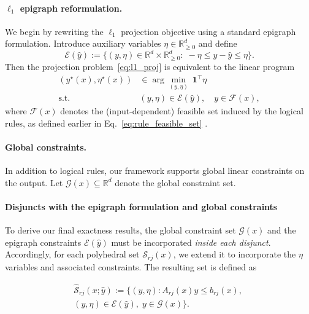 \documentclass{article}
\theoremstyle{plain}
\theoremstyle{definition}
\theoremstyle{remark}
\begin{document}
\paragraph{$\ell_1$ epigraph reformulation.}
We begin by rewriting the $\ell_1$ projection objective using a standard epigraph formulation.
Introduce auxiliary variables $\eta \in \mathbb{R}^d_{\ge 0}$ and define
\begin{equation}
\mathcal{E}(\hat y)
:=
\{(y,\eta)\in\mathbb{R}^d\times\mathbb{R}^d_{\ge 0}:\;
-\eta \le y-\hat y \le \eta\}.
\label{eq:epi_set}
\end{equation}
Then the projection problem~\eqref{eq:l1_proj} is equivalent to the linear program
\begin{equation}
\label{eq:l1_proj_epigraph}
\begin{aligned}
(y^\star(x),\eta^\star(x))
&\in \arg\min_{(y,\eta)}\ \mathbf{1}^\top \eta \\
\text{s.t.}\quad
&(y,\eta)\in \mathcal{E}(\hat y), \quad y\in \mathcal{F}(x),
\end{aligned}
\end{equation}
where $\mathcal{F}(x)$ denotes the (input-dependent) feasible set induced by the logical rules,
as defined earlier in Eq.~\eqref{eq:rule_feasible_set} .


\paragraph{Global constraints.}
In addition to logical rules, our framework supports global linear constraints on the output.
Let $\mathcal{G}(x)\subseteq\mathbb{R}^d$ denote the global constraint set. 

\paragraph{Disjuncts with the epigraph formulation and global constraints}
To derive our final exactness results, the global constraint set $\mathcal{G}(x)$ and the epigraph constraints $\mathcal{E}(\hat{y})$ must be incorporated
\emph{inside each disjunct}. Accordingly, for each polyhedral set $\mathcal{S}_{rj}(x)$, we extend it to incorporate the $\eta$ variables and associated constraints. The resulting set is defined as

\begin{equation}
\begin{aligned}
    \widehat{\mathcal{S}}_{rj}(x;\hat y)
:=
\Big\{(y,\eta): 
A_{rj}(x)y\le b_{rj}(x),\; \\
(y,\eta)\in \mathcal{E}(\hat y),\;
y\in \mathcal{G}(x)
\Big\}.
\end{aligned}
\label{eq:lifted_region}
\end{equation}
\end{document}
